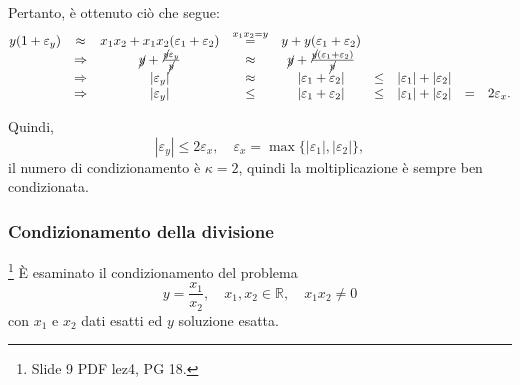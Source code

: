 
Pertanto, è ottenuto ciò che segue:
\begin{equation*}
	\begin{matrix}
		y(1+\varepsilon_y) &\approx& x_1x_2+x_1x_2(\varepsilon_1+\varepsilon_2) &\overset{x_1x_2=y}{=}& y+y(\varepsilon_1+\varepsilon_2)\\
		&\Rightarrow&\cancel{y}+\frac{\cancel{y}\varepsilon_y}{\cancel{y}}&\approx&\cancel{y}+\frac{\cancel{y}(\varepsilon_1+\varepsilon_2)}{\cancel{y}}\\
		&\Rightarrow& |\varepsilon_y| &\approx& |\varepsilon_1+\varepsilon_2| &\leq& |\varepsilon_1|+|\varepsilon_2|\\
		&\Rightarrow& |\varepsilon_y| &\leq& |\varepsilon_1 + \varepsilon_2| &\leq& |\varepsilon_1|+|\varepsilon_2| &=& 2\varepsilon_x.
	\end{matrix}
\end{equation*}

Quindi,
\begin{equation*}
	|\varepsilon_y|\leq 2\varepsilon_x,\quad \varepsilon_x=\max\{|\varepsilon_1|,|\varepsilon_2|\},
\end{equation*}
il numero di condizionamento è $\kappa=2$, quindi la moltiplicazione è sempre ben condizionata.

\subsubsection{Condizionamento della divisione}
\footnote{Slide 9 PDF lez4, PG 18.} È esaminato il condizionamento del problema
\begin{equation}\label{eq:problema_condizionamento_divisione}
	y=\frac{x_1}{x_2},\quad x_1,x_2\in\mathbb R,\quad x_1x_2\neq 0
\end{equation}
con $x_1$ e $x_2$ dati esatti ed $y$ soluzione esatta.

